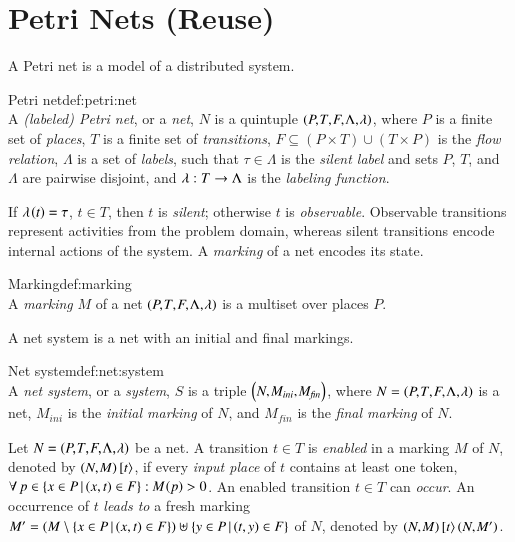 \section{Petri Nets (Reuse)}
\label{sec:reuse:petri:nets}

A Petri net is a model of a distributed system.

\begin{define}{Petri net}{def:petri:net}{\quad\\}
A \emph{(labeled) Petri net}, or a \emph{net}, $N$ is a quintuple $\tuple{P,T,F,\Lambda,\lambda}$, where
$P$ is a finite set of \emph{places},
$T$ is a finite set of \emph{transitions},
$F \subseteq (P \times T) \cup (T \times P)$ is the \emph{flow relation},
$\Lambda$ is a set of \emph{labels}, such that $\tau \in \Lambda$ is the \emph{silent label} and sets $P$, $T$, and $\Lambda$ are pairwise disjoint, and 
${{\lambda}:{T} \rightarrow {\Lambda}}$ is the \emph{labeling function}.
\end{define}

\noindent
If ${\mathit{\lambda}_{\!}\left({t}\right)}=\tau$, $t \in T$, then $t$ is \emph{silent}; otherwise $t$ is \emph{observable}.
Observable transitions represent activities from the problem domain, whereas silent transitions encode internal actions of the system. 
A \emph{marking} of a net encodes its state.

\begin{define}{Marking}{def:marking}{\quad\\}
A \emph{marking} $M$ of a net $\tuple{P,T,F,\Lambda,\lambda}$ is a multiset over places $P$.
\end{define}

\noindent
A net system is a net with an initial and final markings.

\begin{define}{Net system}{def:net:system}{\quad\\}
A \emph{net system}, or a \emph{system}, $S$ is a triple $\tuple{N,M_{\mathit{ini}},M_{\mathit{fin}}}$, where 
$N=\tuple{P,T,F,\Lambda,\lambda}$ is a net,
$M_{\mathit{ini}}$ is the \emph{initial marking} of $N$, and 
$M_{\mathit{fin}}$ is the \emph{final marking} of $N$.
\end{define}

\noindent
Let $N=\tuple{P,T,F,\Lambda,\lambda}$ be a net.
A transition $t \in T$ is \emph{enabled} in a marking $M$ of $N$, denoted by $\enabled{N}{M}{t}$, if every \emph{input place} of $t$ contains at least one token, \ie 
$\forall \, p \in \left\{ x \in P \,|\, (x,t) \in F \right\} : {\mathit{M}_{\!}\left({p}\right)} > 0$. 
An enabled transition $t \in T$ can \emph{occur}.
An occurrence of $t$ \emph{leads to} a fresh marking $M' = (M \setminus \left\{ x \in P \,|\, (x,t) \in F \right\}) \uplus \left\{ y \in P \,|\, (t,y) \in F \right\}$ of $N$, denoted by $\occurrence{N}{M}{t}{M'}$.

